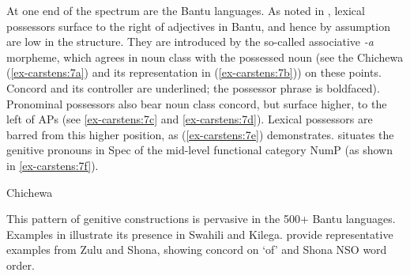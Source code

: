 \documentclass[output=paper
,modfonts
,nonflat]{langsci/langscibook}
\begin{document}
\noindent At one end of the spectrum are the Bantu languages. As noted in , lexical possessors surface to the right of adjectives in Bantu, and hence by assumption are low in the structure. They are introduced by the so-called associative \textit{-a} morpheme, which agrees in noun class with the possessed noun (see the Chichewa (\ref{ex-carstens:7a}) and its representation in (\ref{ex-carstens:7b})) on these points. Concord and its controller are underlined; the possessor phrase is boldfaced). Pronominal possessors also bear noun class concord, but surface higher, to the left of APs (see \ref{ex-carstens:7c} and \ref{ex-carstens:7d}). Lexical possessors are barred from this higher position, as (\ref{ex-carstens:7e}) demonstrates. \citet{Carstens1991, Carstens1997} situates the genitive pronouns in Spec of the mid-level functional category NumP (as shown in \ref{ex-carstens:7f}).
\begin{exe}
		\ex  Chichewa \citep[372, 374]{Carstens1997} \label{ex-carstens:7}
		\xlist
		\endxlist
\end{exe}
This pattern of genitive constructions is pervasive in the 500+ Bantu languages. Examples in  illustrate its presence in Swahili and Kilega.  provide representative examples from Zulu and Shona, showing concord on ‘of’ and Shona NSO word order.
\end{document}
